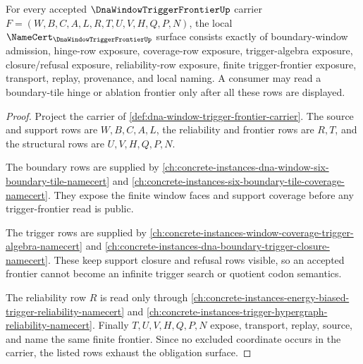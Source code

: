\begin{theorem}
\label{thm:dna-window-trigger-frontier-obligations}
For every accepted $\DnaWindowTriggerFrontierUp$ carrier $F=(W,B,C,A,L,R,T,U,V,H,Q,P,N)$, the local $\NameCert_{\DnaWindowTriggerFrontierUp}$ surface consists exactly of boundary-window admission, hinge-row exposure, coverage-row exposure, trigger-algebra exposure, closure/refusal exposure, reliability-row exposure, finite trigger-frontier exposure, transport, replay, provenance, and local naming. A consumer may read a boundary-tile hinge or ablation frontier only after all these rows are displayed.
\end{theorem}
\begin{proof}
Project the carrier of \autoref{def:dna-window-trigger-frontier-carrier}. The source and support rows are $W,B,C,A,L$, the reliability and frontier rows are $R,T$, and the structural rows are $U,V,H,Q,P,N$.

The boundary rows are supplied by \autoref{ch:concrete-instances-dna-window-six-boundary-tile-namecert} and \autoref{ch:concrete-instances-six-boundary-tile-coverage-namecert}. They expose the finite window faces and support coverage before any trigger-frontier read is public.

The trigger rows are supplied by \autoref{ch:concrete-instances-window-coverage-trigger-algebra-namecert} and \autoref{ch:concrete-instances-dna-boundary-trigger-closure-namecert}. These keep support closure and refusal rows visible, so an accepted frontier cannot become an infinite trigger search or quotient codon semantics.

The reliability row $R$ is read only through \autoref{ch:concrete-instances-energy-biased-trigger-reliability-namecert} and \autoref{ch:concrete-instances-trigger-hypergraph-reliability-namecert}. Finally $T,U,V,H,Q,P,N$ expose, transport, replay, source, and name the same finite frontier. Since no excluded coordinate occurs in the carrier, the listed rows exhaust the obligation surface.
\end{proof}


